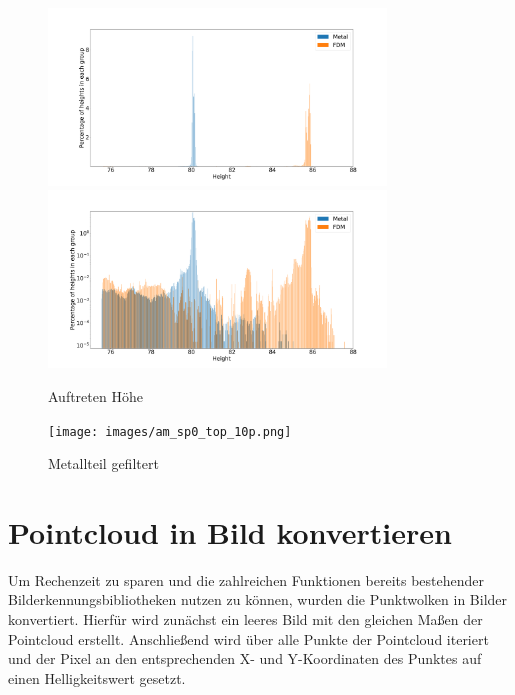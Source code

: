 \begin{figure}
    \centering
    \includegraphics[width=0.8\textwidth]{images/height_occurange.png}
    \includegraphics[width=0.8\textwidth]{images/height_occurange_log.png}
    \caption{Auftreten Höhe}
    \label{fig:brightness}
\end{figure}

\begin{figure}
    \centering
    \texttt{[image: images/am\_sp0\_top\_10p.png]}
    \caption{Metallteil gefiltert}
    \label{fig:metall_image}
\end{figure}

\section{Pointcloud in Bild konvertieren}

Um Rechenzeit zu sparen und die zahlreichen Funktionen bereits bestehender
 Bilderkennungsbibliotheken nutzen zu können, wurden die Punktwolken in Bilder 
 konvertiert. Hierfür wird zunächst ein leeres Bild mit den gleichen 
 Maßen der Pointcloud erstellt. Anschließend wird über alle Punkte der
 Pointcloud iteriert und der Pixel an den 
 entsprechenden X- und Y-Koordinaten des Punktes auf einen Helligkeitswert gesetzt.

